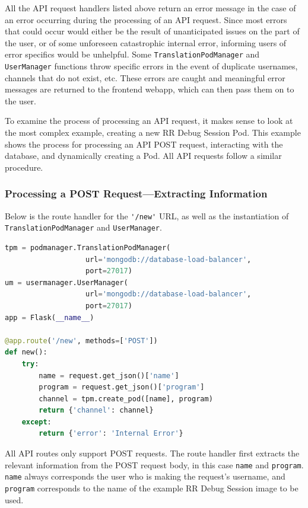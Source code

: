 \documentclass[12pt]{article}
\begin{document}
All the API request handlers listed above return an error message in
the case of an error occurring during the processing of an API request.
Since most errors that could occur would either be the result of
unanticipated issues on the part of the user, or of some unforeseen
catastrophic internal error, informing users of error specifics would
be unhelpful.  Some \lstinline{TranslationPodManager} and
\lstinline{UserManager} functions throw specific errors in the event
of duplicate usernames, channels that do not exist, etc.  These errors
are caught and meaningful error messages are returned to the frontend
webapp, which can then pass them on to the user.
\par

To examine the process of processing an API request, it makes sense to
look at the most complex example, creating a new RR Debug Session Pod.
This example shows the process for processing an API POST request,
interacting with the database, and dynamically creating a Pod.  All
API requests follow a similar procedure.

\subsubsection{Processing a POST Request---Extracting Information}

Below is the route handler for the \lstinline{'/new'} URL, as well as
the instantiation of \lstinline{TranslationPodManager} and
\lstinline{UserManager}.

\begin{lstlisting}[language=Python,basicstyle=\linespread{0.5}\ttfamily,caption={API Server New RR Debug Session Event Handler},captionpos=b]
tpm = podmanager.TranslationPodManager(
                   url='mongodb://database-load-balancer',
                   port=27017)
um = usermanager.UserManager(
                   url='mongodb://database-load-balancer',
                   port=27017)
app = Flask(__name__)

@app.route('/new', methods=['POST'])
def new():
    try:
        name = request.get_json()['name']
        program = request.get_json()['program']
        channel = tpm.create_pod([name], program)
        return {'channel': channel}
    except:
        return {'error': 'Internal Error'}
\end{lstlisting}

All API routes only support POST requests.  The route handler first
extracts the relevant information from the POST request body, in this
case \lstinline{name} and \lstinline{program}.  \lstinline{name}
always corresponds the user who is making the request's username, and
\lstinline{program} corresponds to the name of the example RR Debug
Session image to be used.
\par
\end{document}
